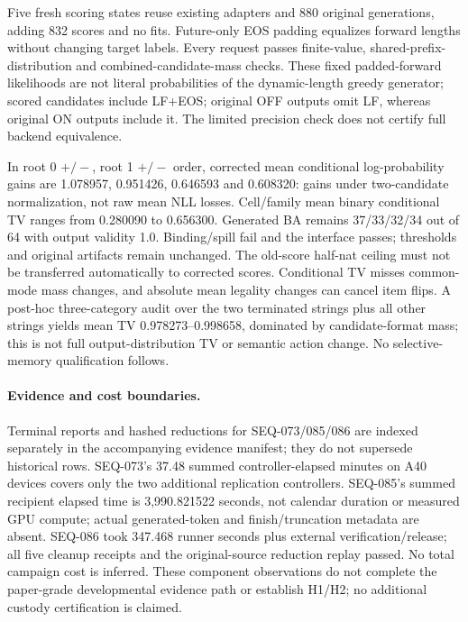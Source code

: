 \documentclass{article}
\begin{document}
Five fresh scoring states reuse existing adapters and 880 original generations, adding 832 scores and no fits. Future-only EOS padding equalizes forward lengths without changing target labels. Every request passes finite-value, shared-prefix-distribution and combined-candidate-mass checks. These fixed padded-forward likelihoods are not literal probabilities of the dynamic-length greedy generator; scored candidates include LF+EOS; original OFF outputs omit LF, whereas original ON outputs include it. The limited precision check does not certify full backend equivalence.

In root 0 $+/-$, root 1 $+/-$ order, corrected mean conditional log-probability gains are 1.078957, 0.951426, 0.646593 and 0.608320: gains under two-candidate normalization, not raw mean NLL losses. Cell/family mean binary conditional TV ranges from 0.280090 to 0.656300. Generated BA remains 37/33/32/34 out of 64 with output validity 1.0. Binding/spill fail and the interface passes; thresholds and original artifacts remain unchanged. The old-score half-nat ceiling must not be transferred automatically to corrected scores. Conditional TV misses common-mode mass changes, and absolute mean legality changes can cancel item flips. A post-hoc three-category audit over the two terminated strings plus all other strings yields mean TV 0.978273--0.998658, dominated by candidate-format mass; this is not full output-distribution TV or semantic action change. No selective-memory qualification follows.

\paragraph{Evidence and cost boundaries.} Terminal reports and hashed reductions for SEQ-073/085/086 are indexed separately in the accompanying evidence manifest; they do not supersede historical rows. SEQ-073's 37.48 summed controller-elapsed minutes on A40 devices covers only the two additional replication controllers. SEQ-085's summed recipient elapsed time is 3,990.821522 seconds, not calendar duration or measured GPU compute; actual generated-token and finish/truncation metadata are absent. SEQ-086 took 347.468 runner seconds plus external verification/release; all five cleanup receipts and the original-source reduction replay passed. No total campaign cost is inferred. These component observations do not complete the paper-grade developmental evidence path or establish H1/H2; no additional custody certification is claimed.
\end{document}
